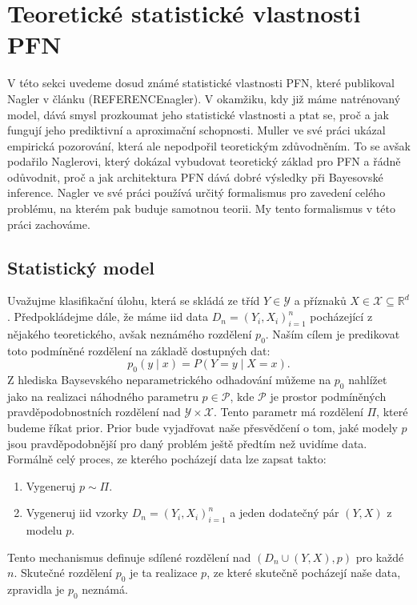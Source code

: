 \section{Teoretické statistické vlastnosti PFN}
V této sekci uvedeme dosud známé statistické vlastnosti PFN, které publikoval Nagler v článku (REFERENCEnagler).
V okamžiku, kdy již máme natrénovaný model, dává smysl prozkoumat jeho statistické vlastnosti a ptat se, proč a jak fungují jeho prediktivní a aproximační schopnosti.
Muller ve své práci ukázal empirická pozorování, která ale nepodpořil teoretickým zdůvodněním.
To se avšak podařilo Naglerovi, který dokázal vybudovat teoretický základ pro PFN a řádně odůvodnit, proč a jak architektura PFN dává dobré výsledky při Bayesovské inference.
Nagler ve své práci používá určitý formalismus pro zavedení celého problému, na kterém pak buduje samotnou teorii.
My tento formalismus v této práci zachováme.

\subsection{Statistický model}
Uvažujme klasifikační úlohu, která se skládá ze tříd $Y \in \mathcal{Y}$ a příznaků $X \in \mathcal{X} \subseteq \mathbb{R}^d$.
Předpokládejme dále, že máme iid data $D_n = (Y_i, X_i)_{i=1}^n$ pocházející z nějakého teoretického, avšak neznámého rozdělení $p_0$.
Naším cílem je predikovat toto podmíněné rozdělení na základě dostupných dat: $$p_0(y \mid x) = P(Y = y \mid X = x).$$
Z hlediska Baysevského neparametrického odhadování můžeme na $p_0$ nahlížet jako na realizaci náhodného parametru $p \in \mathcal{P}$, kde $\mathcal{P}$ je prostor podmíněných pravděpodobnostních rozdělení nad $\mathcal{Y} \times \mathcal{X}$.
Tento parametr má rozdělení $\Pi$, které budeme říkat prior.
Prior bude vyjadřovat naše přesvědčení o tom, jaké modely $p$ jsou pravděpodobnější pro daný problém ještě předtím než uvidíme data.
Formálně celý proces, ze kterého pocházejí data lze zapsat takto:
\begin{enumerate}
    \item Vygeneruj $p \sim \Pi$.
    \item Vygeneruj iid vzorky $D_n = (Y_i, X_i)_{i=1}^n$ a jeden dodatečný pár $(Y, X)$ z modelu $p$.
\label{generace_dat}
\end{enumerate}

Tento mechanismus definuje sdílené rozdělení nad $(D_n \cup (Y, X), p)$ pro každé $n$. 
Skutečné rozdělení $p_0$ je ta realizace $p$, ze které skutečně pocházejí naše data, zpravidla je $p_0$ neznámá.
\par   

